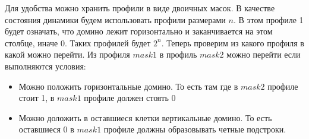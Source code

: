 Для удобства можно хранить профили в виде двоичных масок.
В качестве состояния динамики будем использовать профили размерами $n$.
В этом профиле 1 будет означать, что домино лежит горизонтально и заканчивается на этом столбце, иначе 0.
Таких профилей будет $2^n$.
Теперь проверим из какого профиля в какой можно перейти.
Из профиля $mask1$ в профиль $mask2$ можно перейти если выполняются условия:
\begin{itemize}
\item Можно положить горизонтальные домино.
    То есть там где в $mask2$ профиле стоит 1, в $mask1$ профиле должен стоять 0
\item Можно доложить в оставшиеся клетки вертикальные домино.
    То есть оставшиеся 0 в $mask1$ профиле должны образовывать четные подстроки.
\end{itemize}

\begin{center}
\end{center}

